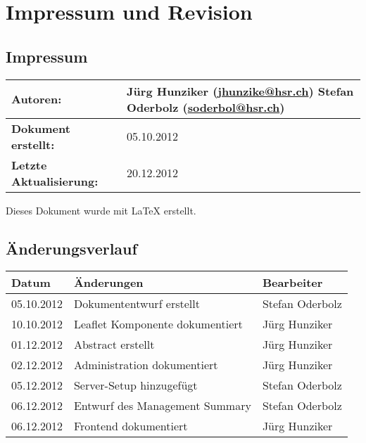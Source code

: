 \chapter*{Impressum und Revision}

\section*{Impressum}
\begin{table}[H] 
\centering 
\begin{tabular}{|p{0.35\twocelltabwidth}|p{0.65\twocelltabwidth}|}
\hline 
\textbf{Autoren:} & Jürg Hunziker (\url{jhunzike@hsr.ch}) \newline
Stefan Oderbolz (\url{soderbol@hsr.ch}) \\ 
\hline 
\textbf{Dokument erstellt:} & 05.10.2012 \\ 
\hline 
\textbf{Letzte Aktualisierung:} & 20.12.2012 \\ 
\hline 
\end{tabular}
\end{table}

Dieses Dokument wurde mit \LaTeX{} erstellt.

\section*{Änderungsverlauf}

\begin{longtable}{|p{0.15\threecelltabwidth}|p{0.65\threecelltabwidth}|p{0.2\threecelltabwidth}|}
\hline 
\textbf{Datum} & \textbf{Änderungen} & \textbf{Bearbeiter} \\ 
\hline 
05.10.2012 & Dokumententwurf erstellt & Stefan Oderbolz \\ 
\hline 
10.10.2012 & Leaflet Komponente dokumentiert & Jürg Hunziker \\ 
\hline 
01.12.2012 & Abstract erstellt & Jürg Hunziker \\ 
\hline 
02.12.2012 & Administration dokumentiert & Jürg Hunziker \\ 
\hline
05.12.2012 & Server-Setup hinzugefügt & Stefan Oderbolz \\ 
\hline 
06.12.2012 & Entwurf des Management Summary & Stefan Oderbolz \\ 
\hline 
06.12.2012 & Frontend dokumentiert & Jürg Hunziker \\ 
\hline 
\end{longtable} 